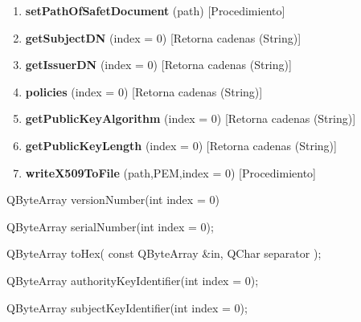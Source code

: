 \documentclass[letterpaper,11pt,spanish]{sphinxmanual}
\begin{document}
\begin{description}
\begin{enumerate}
\begin{description}
\end{description}

\item {} 
\textbf{setPathOfSafetDocument} (path) {[}Procedimiento{]}

\item {} 
\textbf{getSubjectDN} (index = 0) {[}Retorna cadenas (String){]}

\item {} 
\textbf{getIssuerDN} (index = 0) {[}Retorna cadenas (String){]}

\item {} 
\textbf{policies} (index = 0) {[}Retorna cadenas (String){]}

\item {} 
\textbf{getPublicKeyAlgorithm} (index = 0) {[}Retorna cadenas (String){]}

\item {} 
\textbf{getPublicKeyLength} (index = 0) {[}Retorna cadenas (String){]}

\item {} 
\textbf{writeX509ToFile} (path,PEM,index = 0) {[}Procedimiento{]}

\end{enumerate}

QByteArray versionNumber(int index = 0)

QByteArray serialNumber(int index = 0);

QByteArray toHex( const QByteArray \&in, QChar separator );

QByteArray authorityKeyIdentifier(int index = 0);

QByteArray subjectKeyIdentifier(int index = 0);

\end{description}
\end{document}
